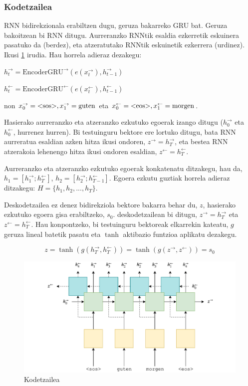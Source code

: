 \documentclass[11pt,a4paper]{article}
\begin{document}
\subsubsection{Kodetzailea}

RNN bidirekzionala erabiltzen dugu, geruza bakarreko GRU bat. Geruza bakoitzean bi RNN ditugu. Aurreranzko RNNtik esaldia ezkerretik eskuinera pasatuko da (berdez), eta atzeratutako RNNtik eskuinetik ezkerrera (urdinez). Ikusi \ref{fig:encoder} irudia. Hau horrela adieraz dezakegu:

$h_t^\rightarrow = \text{EncoderGRU}^\rightarrow(e(x_t^\rightarrow),h_{t-1}^\rightarrow)$

$h_t^\leftarrow = \text{EncoderGRU}^\leftarrow(e(x_t^\leftarrow),h_{t-1}^\leftarrow)$

non $x_0^\rightarrow = \text{\textless sos\textgreater}, x_1^\rightarrow = \text{guten}$ eta $x_0^\leftarrow = \text{\textless eos\textgreater}, x_1^\leftarrow = \text{morgen}$.

Hasierako aurreranzko eta atzeranzko ezkutuko egoerak izango ditugu ($h_0^\rightarrow$ eta $ h_0^\leftarrow$, hurrenez hurren). Bi testuinguru bektore ere lortuko ditugu, bata RNN aurreratua esaldian azken hitza ikusi ondoren, $z^\rightarrow=h_T^\rightarrow$, eta bestea RNN atzerakoia lehenengo hitza ikusi ondoren esaldian, $z^\leftarrow=h_T^\leftarrow$.

Aurreranzko eta atzeranzko ezkutuko egoerak konkatenatu ditzakegu, hau da, $h_1 = [h_1^\rightarrow; h_{T}^\leftarrow]$, $h_2 = [h_2^\rightarrow; h_{T-1}^\leftarrow]$. Egoera ezkutu guztiak horrela adieraz ditzakegu: $H=\{ h_1, h_2, ..., h_T\}$.

Deskodetzailea ez denez bidirekziola bektore bakarra behar du, $z$, hasierako ezkutuko egoera gisa erabiltzeko, $s_0$. deskodetzailean bi ditugu, $z^\rightarrow=h_T^\rightarrow$ eta $z^\leftarrow=h_T^\leftarrow$. Hau konpontzeko, bi testuinguru bektoreak elkarrekin kateatu, $g$ geruza lineal batetik pasatu eta $\tanh$ aktibazio funtzioa aplikatu dezakegu.

$$z=\tanh(g(h_T^\rightarrow, h_T^\leftarrow)) = \tanh(g(z^\rightarrow, z^\leftarrow)) = s_0$$

\begin{figure}[ht]
    \centering
    \includegraphics[width=\linewidth]{encoder}
    \caption{Kodetzailea}
    \label{fig:encoder}
\end{figure}
\end{document}
